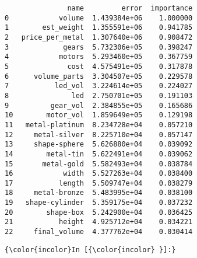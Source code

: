 \documentclass[11pt]{article}
\begin{document}
    
    \begin{verbatim}
               name         error  importance
0            volume  1.439384e+06    1.000000
1        est_weight  1.355591e+06    0.941785
2   price_per_metal  1.307640e+06    0.908472
3             gears  5.732306e+05    0.398247
4            motors  5.293460e+05    0.367759
5              cost  4.575491e+05    0.317878
6      volume_parts  3.304507e+05    0.229578
7           led_vol  3.224614e+05    0.224027
8               led  2.750701e+05    0.191103
9          gear_vol  2.384855e+05    0.165686
10        motor_vol  1.859649e+05    0.129198
11   metal-platinum  8.234728e+04    0.057210
12     metal-silver  8.225710e+04    0.057147
13     shape-sphere  5.626880e+04    0.039092
14        metal-tin  5.622491e+04    0.039062
15       metal-gold  5.582493e+04    0.038784
16            width  5.527263e+04    0.038400
17           length  5.509747e+04    0.038279
18     metal-bronze  5.483995e+04    0.038100
19   shape-cylinder  5.359175e+04    0.037232
20        shape-box  5.242900e+04    0.036425
21           height  4.925712e+04    0.034221
22     final_volume  4.377762e+04    0.030414
    \end{verbatim}

    
    \begin{Verbatim}[commandchars=\\\{\}]
{\color{incolor}In [{\color{incolor} }]:} 
\end{Verbatim}



    
    
    
    
\end{document}
